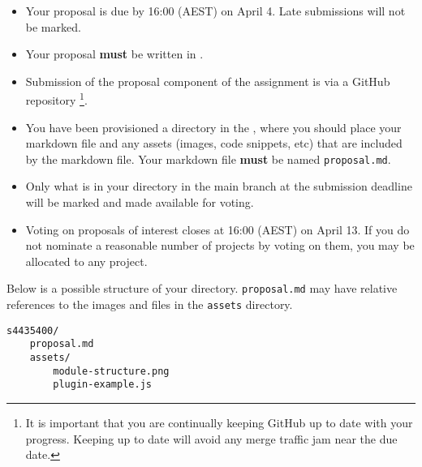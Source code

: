 \documentclass{csse4400}
\begin{document}
\begin{itemize}
    \item Your proposal is due by 16:00 (AEST) on April 4. Late submissions will not be marked.
    \item Your proposal \textbf{must} be written in .
    \item Submission of the proposal component of the assignment is via a GitHub repository%
             \footnote{It is important that you are continually keeping GitHub up to date with your progress.
              Keeping up to date will avoid any merge traffic jam near the due date.}.
    \item You have been provisioned a directory in the ,
          where you should place your markdown file and any assets (images, code snippets, etc) that are included by the markdown file.
          Your markdown file \textbf{must} be named \texttt{proposal.md}.
	\item Only what is in your directory in the main branch at the submission deadline will be marked and made available for voting.
    \item Voting on proposals of interest closes at 16:00 (AEST) on April 13.
          If you do not nominate a reasonable number of projects by voting on them, you may be allocated to any project.
\end{itemize}

\noindent
Below is a possible structure of your directory.
\texttt{proposal.md} may have relative references to the images and files in the \texttt{assets} directory.

\begin{verbatim}
s4435400/
    proposal.md
    assets/
        module-structure.png
        plugin-example.js
\end{verbatim}
\end{document}
